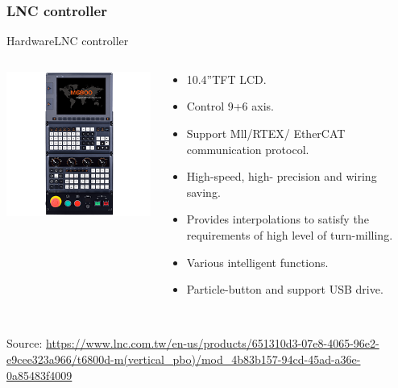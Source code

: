 \documentclass[11pt]{beamer}
\begin{document}
\subsubsection{{LNC controller}}
\begin{frame}{Hardware}{LNC controller}
  \begin{columns}
    \begin{column}{0.48\textwidth}
      \includegraphics[width=\linewidth]{M6800-30020180627160202.png}
    \end{column}
    \begin{column}{0.7\textwidth}
      \small
      \begin{itemize}
        \item 10.4”TFT LCD.
        \item Control 9+6 axis.
        \item Support Mll/RTEX/ EtherCAT communication protocol.
        \item High-speed, high- precision and wiring saving.
        \item Provides interpolations to satisfy the requirements of high level of turn-milling.
        \item Various intelligent functions.
        \item Particle-button and support USB drive. \\\
      \end{itemize}
    \end{column}
\end{columns}
\tiny{Source: \url{https://www.lnc.com.tw/en-us/products/651310d3-07e8-4065-96e2-e9cee323a966/t6800d-m(vertical_pbo)/mod_4b83b157-94cd-45ad-a36e-0a85483f4009}}
\end{frame}
\end{document}
